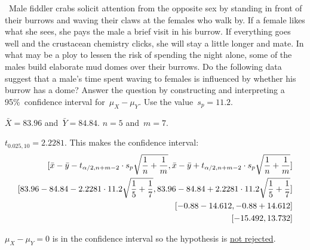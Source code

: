 \begin{problem}
  ~Male fiddler crabs solicit attention from the opposite sex by standing in front of their burrows and waving their claws at the females who walk by. If a female likes what she sees, she pays the male a brief visit in his burrow. If everything goes well and the crustacean chemistry clicks, she will stay a little longer and mate. In what may be a ploy to lessen the risk of spending the night alone, some of the males build elaborate mud domes over their burrows. Do the following data suggest that a male's time spent waving to females is influenced by whether his burrow has a dome? Answer the question by constructing and interpreting a 95\%~confidence interval for~${\mu_{X} - \mu_{Y}}$. Use the value~${s_p = 11.2}$.
\end{problem}

\noindent
${\bar{X} = 83.96}$ and~${\bar{Y} = 84.84}$. ${n = 5}$ and~${m = 7}$.

\noindent
${t_{0.025,10} = 2.2281}$.  This makes the confidence interval:
\begin{align}
  \lbrack\bar{x} - \bar{y} - t_{\alpha/2,n+m-2} \cdot s_p\sqrt{\frac{1}{n} + \frac{1}{m}},\bar{x} - \bar{y} + t_{\alpha/2,n+m-2} \cdot s_p\sqrt{\frac{1}{n} + \frac{1}{m}}\rbrack \\
  \lbrack83.96 - 84.84 - 2.2281 \cdot 11.2 \sqrt{\frac{1}{5} + \frac{1}{7}}, 83.96 - 84.84 + 2.2281 \cdot 11.2 \sqrt{\frac{1}{5} + \frac{1}{7}}\rbrack \\
  \lbrack-0.88 - 14.612, -0.88 + 14.612\rbrack \\
  \lbrack-15.492, 13.732\rbrack
\end{align}

\noindent
${\mu_{X} - \mu_{Y} = 0}$ is in the confidence interval so the hypothesis is \underline{not rejected}.

